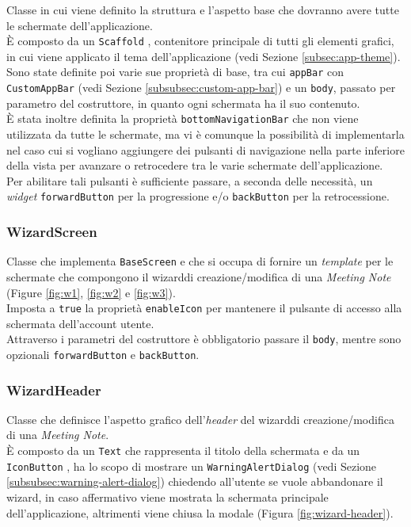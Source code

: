 Classe in cui viene definito la struttura e l'aspetto base che dovranno avere tutte le schermate dell'applicazione.\\
È composto da un \lstinline{Scaffold} \cite{site:scaffold}, contenitore principale di tutti gli elementi grafici, in cui viene applicato il tema dell'applicazione (vedi Sezione \ref{subsec:app-theme}). \\
Sono state definite poi varie sue proprietà di base, tra cui \lstinline{appBar} con \lstinline{CustomAppBar} (vedi Sezione \ref{subsubsec:custom-app-bar}) e un \lstinline{body}, passato per parametro del costruttore, in quanto ogni schermata ha il suo contenuto.\\
È stata inoltre definita la proprietà \lstinline{bottomNavigationBar} che non viene utilizzata da tutte le schermate, ma vi è comunque la possibilità di implementarla nel caso cui si vogliano aggiungere dei pulsanti di navigazione nella parte inferiore della vista per avanzare o retrocedere tra le varie schermate dell'applicazione.\\
Per abilitare tali pulsanti è sufficiente passare, a seconda delle necessità, un \emph{widget} \lstinline{forwardButton} per la progressione e/o \lstinline{backButton} per la retrocessione.

\subsubsection*{WizardScreen}
\label{subsubsec:wizard-screen}

Classe che implementa \lstinline{BaseScreen} e che si occupa di fornire un \emph{template} per le schermate che compongono il \gls{wizard}\glsoccur di creazione/modifica di una \emph{Meeting Note} (Figure \ref{fig:w1}, \ref{fig:w2} e \ref{fig:w3}).\\
Imposta a \lstinline{true} la proprietà \lstinline{enableIcon} per mantenere il pulsante di accesso alla schermata dell'account utente.\\
Attraverso i parametri del costruttore è obbligatorio passare il \lstinline{body}, mentre sono opzionali \lstinline{forwardButton} e \lstinline{backButton}.

\subsubsection*{WizardHeader}
\label{subsubsec:wizard-header}

Classe che definisce l'aspetto grafico dell'\emph{header} del \gls{wizard}\glsoccur di creazione/modifica di una \emph{Meeting Note}.\\
È composto da un \lstinline{Text} \cite{site:text} che rappresenta il titolo della schermata e da un \lstinline{IconButton} \cite{site:icon-button}, ha lo scopo di mostrare un \lstinline{WarningAlertDialog} (vedi Sezione \ref{subsubsec:warning-alert-dialog}) chiedendo all'utente se vuole abbandonare il \gls{wizard}\glsoccur, in caso affermativo viene mostrata la schermata principale dell'applicazione, altrimenti viene chiusa la modale (Figura \ref{fig:wizard-header}). 

